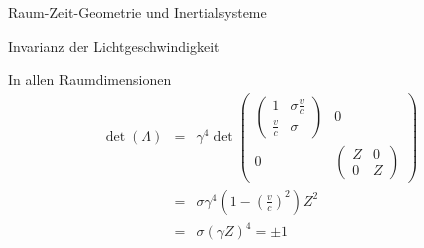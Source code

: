 \begin{chapter}{\titlestr}
\begin{section}{Raum-Zeit-Geometrie und Inertialsysteme}
\begin{subsection}{Invarianz der Lichtgeschwindigkeit}
\begin{subsubsection}{In allen Raumdimensionen}
\begin{eqnarray*}
\det(\Lambda) &=&
\gamma^4
\det
\begin{pmatrix}
\begin{pmatrix}
1 & \sigma\frac{v}{c}\\
\frac{v}{c} & \sigma
\end{pmatrix} & 0\\
0 & \begin{pmatrix}
Z & 0\\
0 & Z
\end{pmatrix}
\end{pmatrix}\\
&=&\sigma\gamma^4\left(1-\left(\frac{v}{c}\right)^2\right)Z^2\\
&=&\sigma\left(\gamma Z\right)^4=\pm 1
\end{eqnarray*}
\end{subsubsection}
\end{subsection}



\end{section}
\end{chapter}
